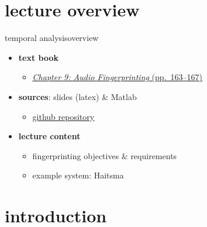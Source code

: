 

\subtitle{Part 10.1: Audio Fingerprinting}


	

    \section[overview]{lecture overview}
        \begin{frame}{temporal analysis}{overview}
            \begin{itemize}
                \item   \textbf{text book}  
                    \begin{itemize}
                        \item   \href{http://ieeexplore.ieee.org/xpl/articleDetails.jsp?tp=&arnumber=6331126&}{\underline{\textit{Chapter 9: Audio Fingerprinting} (pp.~163--167)}}
                    \end{itemize}
                \item   \textbf{sources}: slides (latex) \& Matlab  
                    \begin{itemize}
                        \item   \href{https://github.com/alexanderlerch/ACA-Slides}{\underline{github repository}}
                    \end{itemize}
                \bigskip
                \item<2->   \textbf{lecture content}
                    \begin{itemize}
                        \item<2->   fingerprinting objectives \& requirements
                        \item<3->   example system: Haitsma
                    \end{itemize}
            \end{itemize}
        \end{frame}

    \section[intro]{introduction}


